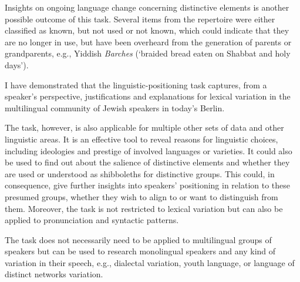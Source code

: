 \documentclass[output=paper]{langscibook}
\begin{document}
Insights on ongoing language change concerning distinctive elements is another possible outcome of this task. Several items from the repertoire were either classified as known, but not used or not known, which could indicate that they are no longer in use, but have been overheard from the generation of parents or grandparents, e.g., Yiddish \textit{Barches} (‘braided bread eaten on Shabbat and holy days’).

\begin{sloppypar}
I have demonstrated that the linguistic-positioning task captures, from a speaker’s perspective, justifications and explanations for lexical variation in the multilingual community of Jewish speakers in today's Berlin.
\end{sloppypar}

The task, however, is also applicable for multiple other sets of data and other linguistic areas. It is an effective tool to reveal reasons for linguistic choices, including ideologies and prestige of involved languages or varieties. It could also be used to find out about the salience of distinctive elements and whether they are used or understood as shibboleths for distinctive groups. This could, in consequence, give further insights into speakers’ positioning in relation to these presumed groups, whether they wish to align to or want to distinguish from them. Moreover, the task is not restricted to lexical variation but can also be applied to pronunciation and syntactic patterns.

The task does not necessarily need to be applied to multilingual groups of speakers but can be used to research monolingual speakers and any kind of variation in their speech, e.g., dialectal variation, youth language, or language of distinct networks variation.

\sloppy\printbibliography[heading=subbibliography,notkeyword=this]
\end{document}
